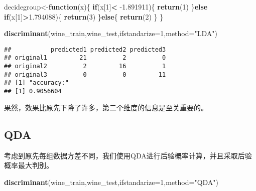 \documentclass[]{article}
\newenvironment{Shaded}{\begin{snugshade}}{\end{snugshade}}
\newcommand{\ControlFlowTok}[1]{\textcolor[rgb]{0.13,0.29,0.53}{\textbf{#1}}}
\newcommand{\DataTypeTok}[1]{\textcolor[rgb]{0.13,0.29,0.53}{#1}}
\newcommand{\DecValTok}[1]{\textcolor[rgb]{0.00,0.00,0.81}{#1}}
\newcommand{\FloatTok}[1]{\textcolor[rgb]{0.00,0.00,0.81}{#1}}
\newcommand{\KeywordTok}[1]{\textcolor[rgb]{0.13,0.29,0.53}{\textbf{#1}}}
\newcommand{\NormalTok}[1]{#1}
\newcommand{\OperatorTok}[1]{\textcolor[rgb]{0.81,0.36,0.00}{\textbf{#1}}}
\newcommand{\StringTok}[1]{\textcolor[rgb]{0.31,0.60,0.02}{#1}}
\begin{document}
\begin{Shaded}
\begin{Highlighting}[]
\NormalTok{decidegroup<-}\ControlFlowTok{function}\NormalTok{(x)\{}
  \ControlFlowTok{if}\NormalTok{(x[}\DecValTok{1}\NormalTok{]}\OperatorTok{<}\StringTok{ }\FloatTok{-1.891911}\NormalTok{)\{}
    \KeywordTok{return}\NormalTok{(}\DecValTok{1}\NormalTok{)}
\NormalTok{  \}}\ControlFlowTok{else} \ControlFlowTok{if}\NormalTok{(x[}\DecValTok{1}\NormalTok{]}\OperatorTok{>}\FloatTok{1.794088}\NormalTok{)\{}
    \KeywordTok{return}\NormalTok{(}\DecValTok{3}\NormalTok{)}
\NormalTok{  \}}\ControlFlowTok{else}\NormalTok{\{}
    \KeywordTok{return}\NormalTok{(}\DecValTok{2}\NormalTok{)}
\NormalTok{  \}  }
\NormalTok{\}}
\end{Highlighting}
\end{Shaded}

\begin{Shaded}
\begin{Highlighting}[]
\KeywordTok{discriminant}\NormalTok{(wine_train,wine_test,}\DataTypeTok{ifstandarize=}\DecValTok{1}\NormalTok{,}\DataTypeTok{method=}\StringTok{"LDA"}\NormalTok{)}
\end{Highlighting}
\end{Shaded}

\begin{verbatim}
##           predicted1 predicted2 predicted3
## original1         21          2          0
## original2          2         16          1
## original3          0          0         11
## [1] "accuracy:"
## [1] 0.9056604
\end{verbatim}

果然，效果比原先下降了许多，第二个维度的信息是至关重要的。

\hypertarget{qda}{%
\subsection{QDA}\label{qda}}

考虑到原先每组数据方差不同，我们使用QDA进行后验概率计算，并且采取后验概率最大判别。

\begin{Shaded}
\begin{Highlighting}[]
\KeywordTok{discriminant}\NormalTok{(wine_train,wine_test,}\DataTypeTok{ifstandarize=}\DecValTok{1}\NormalTok{,}\DataTypeTok{method=}\StringTok{"QDA"}\NormalTok{)}
\end{Highlighting}
\end{Shaded}
\end{document}
